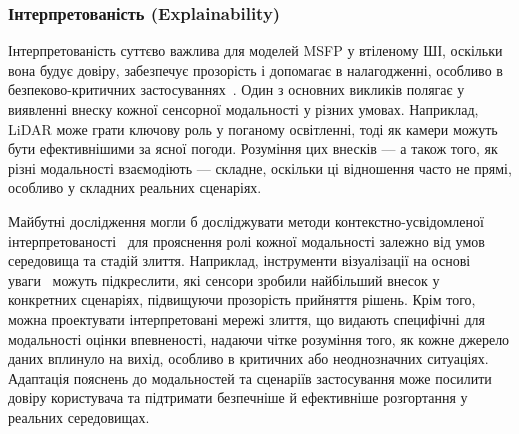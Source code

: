 \subsubsection{Інтерпретованість (Explainability)}

Інтерпретованість суттєво важлива для моделей MSFP у втіленому ШІ, оскільки вона будує довіру, забезпечує прозорість і допомагає в налагодженні, особливо в безпеково-критичних застосуваннях~\cite{de2024building}.
Один з основних викликів полягає у виявленні внеску кожної сенсорної модальності у різних умовах.
Наприклад, LiDAR може грати ключову роль у поганому освітленні, тоді як камери можуть бути ефективнішими за ясної погоди.
Розуміння цих внесків — а також того, як різні модальності взаємодіють — складне, оскільки ці відношення часто не прямі, особливо у складних реальних сценаріях.

Майбутні дослідження могли б досліджувати методи контекстно-усвідомленої інтерпретованості~\cite{wang2023context} для прояснення ролі кожної модальності залежно від умов середовища та стадій злиття.
Наприклад, інструменти візуалізації на основі уваги~\cite{jin2022visual, yeh2023attentionviz} можуть підкреслити, які сенсори зробили найбільший внесок у конкретних сценаріях, підвищуючи прозорість прийняття рішень.
Крім того, можна проектувати інтерпретовані мережі злиття, що видають специфічні для модальності оцінки впевненості, надаючи чітке розуміння того, як кожне джерело даних вплинуло на вихід, особливо в критичних або неоднозначних ситуаціях.
Адаптація пояснень до модальностей та сценаріїв застосування може посилити довіру користувача та підтримати безпечніше й ефективніше розгортання у реальних середовищах.
